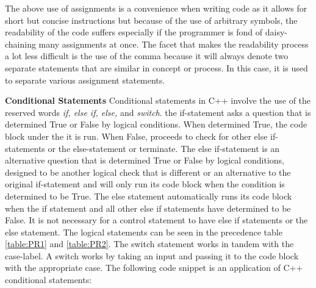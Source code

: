 \documentclass[12pt]{article}
\begin{document}
The above use of assignments is a convenience when writing code as it allows for short but concise instructions but because of the use of arbitrary symbols, the readability of the code suffers especially if the programmer is fond of daisy-chaining many assignments at once. The facet that makes the readability process a lot less difficult is the use of the comma because it will always denote two separate statements that are similar in concept or process. In this case, it is used to separate various assignment statements.

\textbf{Conditional Statements} Conditional statements in C++ involve the use of the reserved words \textit{if, else if, else,} and \textit{switch}. the if-statement asks a question that is determined True or False by logical conditions. When determined True, the code block under the it is run. When False, proceeds to check for other else if-statements or the else-statement or terminate. The else if-statement is an alternative question that is determined True or False by logical conditions, designed to be another logical check that is different or an alternative to the original if-statement and will only run its code block when the condition is determined to be True. The else statement automatically runs its code block when the if statement and all other else if statements have determined to be False. It is not necessary for a control statement to have else if statements or the else statement. The logical statements can be seen in the precedence table \ref{table:PR1} and \ref{table:PR2}. The switch statement works in tandem with the case-label. A switch works by taking an input and passing it to the code block with the appropriate case. The following code snippet is an application of C++ conditional statements:
\end{document}
